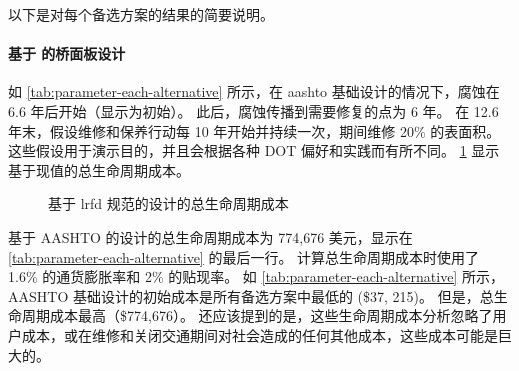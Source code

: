 以下是对每个备选方案的结果的简要说明。


\paragraph*{基于 \lrfd 的桥面板设计}
如 \cref{tab:parameter-each-alternative} 所示，在 \gls*{aashto} 基础设计的情况下，腐蚀在 6.6 年后开始（显示为初始）。 此后，腐蚀传播到需要修复的点为 6 年。 在 12.6 年末，假设维修和保养行动每 10 年开始并持续一次，期间维修 20\% 的表面积。 这些假设用于演示目的，并且会根据各种 DOT 偏好和实践而有所不同。 \cref{fig:total-life-cost} 显示基于现值的总生命周期成本。

\begin{figure}
  \caption{基于 \acrshort{lrfd} 规范的设计的总生命周期成本}\label{fig:total-life-cost}
\end{figure}

基于 AASHTO 的设计的总生命周期成本为 774,676 美元，显示在 \cref{tab:parameter-each-alternative} 的最后一行。 计算总生命周期成本时使用了 1.6\% 的通货膨胀率和 2\% 的贴现率。 如 \cref{tab:parameter-each-alternative} 所示，AASHTO 基础设计的初始成本是所有备选方案中最低的 (\$37, 215)。 但是，总生命周期成本最高（\$774,676）。 还应该提到的是，这些生命周期成本分析忽略了用户成本，或在维修和关闭交通期间对社会造成的任何其他成本，这些成本可能是巨大的。


